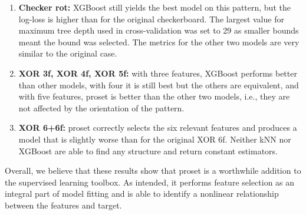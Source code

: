 \begin{enumerate}
\item\textbf{Checker rot:} XGBoost still yields the best model on this pattern, but the log-loss is higher than for the original checkerboard.
The largest value for maximum tree depth used in cross-validation was set to 29 as smaller bounds meant the bound was selected.
The metrics for the other two models are very similar to the original case.
%
\item\textbf{XOR 3f, XOR 4f, XOR 5f:} with three features, XGBoost performs better than other models, with four it is still best but the others are equivalent, and with five features, proset is better than the other two models, i.e., they are not affected by the orientation of the pattern.
%
\item\textbf{XOR 6+6f:} proset correctly selects the six relevant features and produces a model that is slightly worse than for the original XOR 6f.
Neither kNN nor XGBoost are able to find any structure and return constant estimators.
\end{enumerate}
%
Overall, we believe that these results show that proset is a worthwhile addition to the supervised learning toolbox.
As intended, it performs feature selection as an integral part of model fitting and is able to identify a nonlinear relationship between the features and target.
%
\endinput
